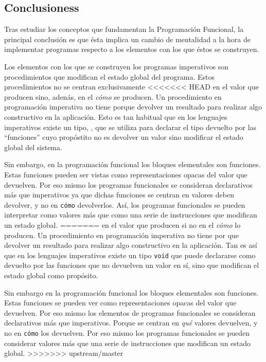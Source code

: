 \documentclass[../main.tex]{subfiles}
\begin{document}
\subsection{Conclusioness}
Tras estudiar los conceptos que fundamentan la Programación Funcional, la principal
conclusión es que ésta implica un cambio de mentalidad a la hora de implementar programas
respecto a los elementos con los que éstos se construyen.

Los elementos con los que se construyen los programas imperativos son procedimientos
que modifican el estado global del programa. Estos procedimientos no se centran exclusivamente
<<<<<<< HEAD
en el valor que producen sino, adenás, en el \textit{cómo} se producen. Un procedimiento en programación
imperativa no tiene porque devolver un resultado para realizar algo constructivo en la aplicación.
Esto es tan habitual que en los lenguajes imperativos existe un tipo, , que se utiliza
para declarar el tipo devuelto por las ``funciones'' cuyo propóstito no es devolver un valor sino  
modificar el estado global del sistema.

Sin embargo, en la programación funcional los bloques elementales son funciones. Estas
funciones pueden ser vistas como representaciones opacas del valor que devuelven. Por eso
mismo los programas funcionales se consideran declarativos más que imperativos ya que
dichas funciones se centran en  valores deben devolver, y no en \texttt{cómo} 
devolverlos. Así, los programas funcionales se pueden interpretar como valores más que como 
una serie de instrucciones que modifican un estado global.
=======
en el valor que producen si no en el \textit{cómo} lo producen. Un procedimiento en programación
imperativa no tiene por que devolver un resultado para realizar algo constructivo en la aplicación.
Tan es así que en los lenguajes imperativos existe un tipo \texttt{void} que puede declararse
como devuelto por las funciones que no devuelven un valor en sí, sino que modifican el estado global
como propósito.

Sin embargo en la programación funcional los bloques elementales son funciones. Estas
funciones se pueden ver como representaciones opacas del valor que devuelven. Por eso
mismo los elementos de programas funcionales se consideran declarativos más que imperativos.
Porque se centran en \textit{qué} valores devuelven, y no en \texttt{cómo} los devuelven.
Por eso mismo los programas funcionales se pueden considerar valores más que una serie de
instrucciones que modifican un estado global.
>>>>>>> upstream/master
\end{document}
